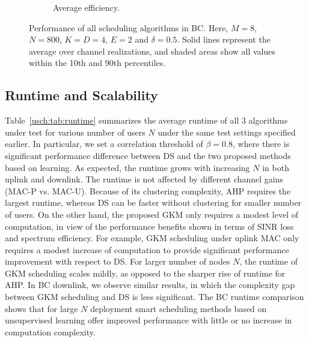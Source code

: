 \begin{figure}[ht]
\begin{subfigure}{0.48\linewidth}
		\caption{Average efficiency. }
		\label{usch:fig:BCP_efficiency_M8_N800}
	\end{subfigure}
	\caption[Performance of all scheduling algorithms in BC.]{Performance of all scheduling algorithms in BC. Here, $M=8$, $N=800$, $K=D=4$, $E=2$ and $\delta=0.5$. Solid lines represent the average over channel realizations, and shaded areas show all values within the 10th and 90th percentiles.}
	\label{usch:fig:BCP_M8_N800}
\end{figure}

\subsection{Runtime and Scalability}
Table~\ref{usch:tab:runtime} summarizes the average runtime of all 3 algorithms under test for various number of users $N$ under the same test settings specified earlier. 
In particular, we set a correlation threshold of $\beta=0.8$, where there is significant performance difference between DS and the two proposed methods based on learning. 
As expected, the runtime grows with increasing $N$ in both uplink and downlink. 
The runtime is not affected by different channel gains (MAC-P vs. MAC-U). 
Because of its clustering complexity, AHP requires the largest runtime, whereas DS can be faster without clustering for smaller number of users. 
On the other hand, the proposed GKM only requires a modest level of computation, in view of the performance benefits shown in terms of SINR loss and spectrum efficiency. 
For
example, GKM scheduling under uplink MAC only requires 
a modest increase of computation to provide significant performance improvement with respect to DS. 
For larger number of nodes $N$, the runtime of GKM scheduling scales mildly, as opposed to the sharper rise of runtime for AHP. 
In BC downlink, we observe similar results, in which the complexity gap between GKM scheduling and DS is less significant. 
The BC runtime comparison shows that for large $N$ deployment smart scheduling methods based on unsupervised learning offer improved performance with little or no increase in computation complexity. 

